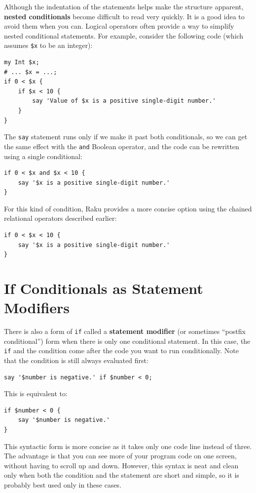 Although the indentation of 
the statements helps make the structure apparent, 
{\bf nested conditionals} become difficult to read very 
quickly.  It is a good idea to avoid them when you can.
Logical operators often provide a way to simplify nested 
conditional statements.  For example, consider the 
following code (which assumes \verb'$x' to be an integer):

\begin{verbatim}
my Int $x;
# ... $x = ...;
if 0 < $x {
    if $x < 10 {
        say 'Value of $x is a positive single-digit number.'
    }
}
\end{verbatim}
%
The {\tt say} statement runs only if we make it past both
conditionals, so we can get the same effect with the {\tt and} 
Boolean operator, and the code can be rewritten using a 
single conditional:

\begin{verbatim}
if 0 < $x and $x < 10 {
    say '$x is a positive single-digit number.'
}
\end{verbatim}

For this kind of condition, Raku provides a more concise 
option using the chained relational operators described earlier:

\begin{verbatim}
if 0 < $x < 10 {
    say '$x is a positive single-digit number.'
}
\end{verbatim}

\section{If Conditionals as Statement Modifiers}
 
 

There is also a form of {\tt if} called a {\bf statement 
modifier} (or sometimes  ``postfix conditional'') form when there is only 
one conditional statement. In this case, the {\tt if} and the 
condition come after the code you want to run conditionally. Note 
that the condition is still always evaluated first:

\begin{verbatim}
say '$number is negative.' if $number < 0;
\end{verbatim}
%
This is equivalent to:
\begin{verbatim}
if $number < 0 {
    say '$number is negative.' 
}
\end{verbatim}
%
This syntactic form is more concise as it takes only one code 
line instead of three. The advantage is that you can see more
of your program code on one screen, without having to scroll up 
and down. However, this syntax is neat and clean only when 
both the condition and the statement are short and simple, so it 
is probably best used only in these cases.

